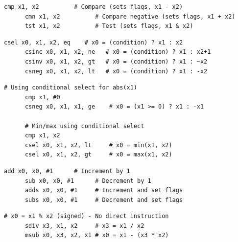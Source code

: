   \begin{definition}
    \label{def:comparison-operations}
    \begin{lstlisting}[language=arm]
      cmp x1, x2          # Compare (sets flags, x1 - x2)
      cmn x1, x2          # Compare negative (sets flags, x1 + x2)
      tst x1, x2          # Test (sets flags, x1 & x2)
    \end{lstlisting}
  \end{definition}

  \begin{definition}
    \label{def:conditional-operations}
    \begin{lstlisting}[language=arm]
      csel x0, x1, x2, eq    # x0 = (condition) ? x1 : x2
      csinc x0, x1, x2, ne   # x0 = (condition) ? x1 : x2+1
      csinv x0, x1, x2, gt   # x0 = (condition) ? x1 : ~x2
      csneg x0, x1, x2, lt   # x0 = (condition) ? x1 : -x2
    \end{lstlisting}
  \end{definition}

  \begin{definition}
    \label{def:absolute-value-and-min-max}
    \begin{lstlisting}[language=arm]
      # Using conditional select for abs(x1)
      cmp x1, #0
      csneg x0, x1, x1, ge    # x0 = (x1 >= 0) ? x1 : -x1
      
      # Min/max using conditional select
      cmp x1, x2
      csel x0, x1, x2, lt     # x0 = min(x1, x2)
      csel x0, x1, x2, gt     # x0 = max(x1, x2)
    \end{lstlisting}
  \end{definition}

  \begin{definition}
    \label{def:increment-decrement}
    \begin{lstlisting}[language=arm]
      add x0, x0, #1      # Increment by 1
      sub x0, x0, #1      # Decrement by 1
      adds x0, x0, #1     # Increment and set flags
      subs x0, x0, #1     # Decrement and set flags
    \end{lstlisting}
  \end{definition}

  \begin{definition}
    \label{def:modulo-operation}
    \begin{lstlisting}[language=arm]
      # x0 = x1 % x2 (signed) - No direct instruction
      sdiv x3, x1, x2     # x3 = x1 / x2
      msub x0, x3, x2, x1 # x0 = x1 - (x3 * x2)
    \end{lstlisting}
  \end{definition}

